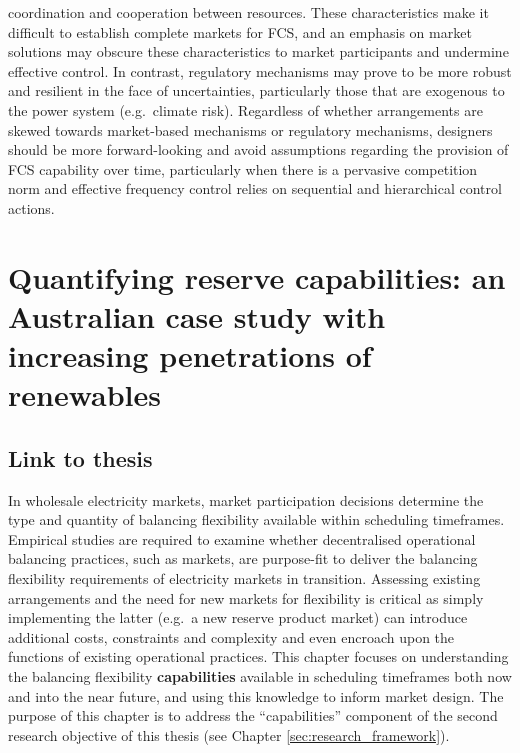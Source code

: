 \documentclass[12pt,a4paper,]{report}
\begin{document}
\begin{enumerate}
  coordination and cooperation between resources. These characteristics
  make it difficult to establish complete markets for FCS, and an
  emphasis on market solutions may obscure these characteristics to
  market participants and undermine effective control. In contrast,
  regulatory mechanisms may prove to be more robust and resilient in the
  face of uncertainties, particularly those that are exogenous to the
  power system (e.g.~climate risk). Regardless of whether arrangements
  are skewed towards market-based mechanisms or regulatory mechanisms,
  designers should be more forward-looking and avoid assumptions
  regarding the provision of FCS capability over time, particularly when
  there is a pervasive competition norm and effective frequency control
  relies on sequential and hierarchical control actions.
\end{enumerate}

\hypertarget{sec:reserves}{%
\chapter{Quantifying reserve capabilities: an Australian case study with
increasing penetrations of renewables}\label{sec:reserves}}

\hypertarget{link-to-thesis-1}{%
\section{Link to thesis}\label{link-to-thesis-1}}

In wholesale electricity markets, market participation decisions
determine the type and quantity of balancing flexibility available
within scheduling timeframes. Empirical studies are required to examine
whether decentralised operational balancing practices, such as markets,
are purpose-fit to deliver the balancing flexibility requirements of
electricity markets in transition. Assessing existing arrangements and
the need for new markets for flexibility is critical as simply
implementing the latter (e.g.~a new reserve product market) can
introduce additional costs, constraints and complexity and even encroach
upon the functions of existing operational practices. This chapter
focuses on understanding the balancing flexibility \textbf{capabilities}
available in scheduling timeframes both now and into the near future,
and using this knowledge to inform market design. The purpose of this
chapter is to address the ``capabilities'' component of the second
research objective of this thesis (see Chapter
\ref{sec:research_framework}).
\end{document}
